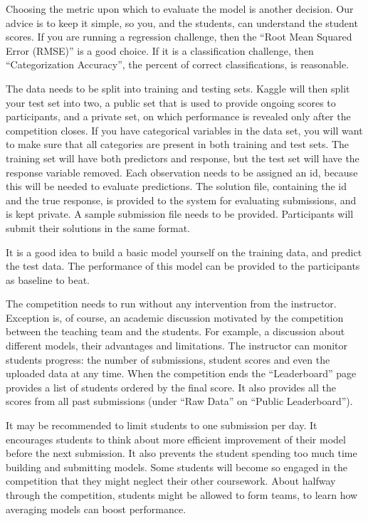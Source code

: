 \documentclass[12pt]{article}
\begin{document}
Choosing the metric upon which to evaluate the model is another
decision. Our advice is to keep it simple, so you, and the students, can
understand the student scores. If you are running a regression
challenge, then the ``Root Mean Squared Error (RMSE)'' is a good choice.
If it is a classification challenge, then ``Categorization Accuracy'',
the percent of correct classifications, is reasonable.

The data needs to be split into training and testing sets. Kaggle will
then split your test set into two, a public set that is used to provide
ongoing scores to participants, and a private set, on which performance
is revealed only after the competition closes. If you have categorical
variables in the data set, you will want to make sure that all
categories are present in both training and test sets. The training set
will have both predictors and response, but the test set will have the
response variable removed. Each observation needs to be assigned an id,
because this will be needed to evaluate predictions. The solution file,
containing the id and the true response, is provided to the system for
evaluating submissions, and is kept private. A sample submission file
needs to be provided. Participants will submit their solutions in the
same format.

It is a good idea to build a basic model yourself on the training data,
and predict the test data. The performance of this model can be provided
to the participants as baseline to beat.

The competition needs to run without any intervention from the
instructor. Exception is, of course, an academic discussion motivated by
the competition between the teaching team and the students. For example,
a discussion about different models, their advantages and limitations.
The instructor can monitor students progress: the number of submissions,
student scores and even the uploaded data at any time. When the
competition ends the ``Leaderboard'' page provides a list of students
ordered by the final score. It also provides all the scores from all
past submissions (under ``Raw Data'' on ``Public Leaderboard'').

It may be recommended to limit students to one submission per day. It
encourages students to think about more efficient improvement of their
model before the next submission. It also prevents the student spending
too much time building and submitting models. Some students will become
so engaged in the competition that they might neglect their other
coursework. About halfway through the competition, students might be
allowed to form teams, to learn how averaging models can boost
performance.
\end{document}
